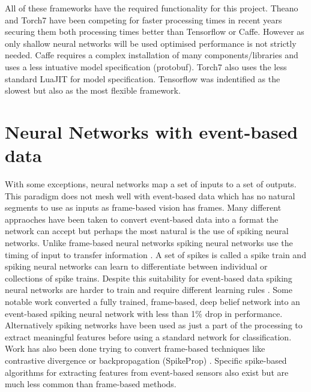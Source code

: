 All of these frameworks have the required functionality for this project.
Theano and Torch7 have been competing for faster processing times \cite{bergstra2010theano, collobert2011torch7, bastien2012theano} in recent years securing them both processing times better than Tensorflow or Caffe\cite{bahrampour2015comparative}.
However as only shallow neural networks will be used optimised performance is not strictly needed.
Caffe requires a complex installation of many components/libraries and uses a less intuative model specification (protobuf). 
Torch7 also uses the less standard LuaJIT for model specification.
Tensorflow was indentified as the slowest but also as the most flexible framework.

\section{Neural Networks with event-based data}
With some exceptions, neural networks map a set of inputs to a set of outputs.
This paradigm does not mesh well with event-based data which has no natural segments to use as inputs as frame-based vision has frames. 
Many different appraoches have been taken to convert event-based data into a format the network can accept but perhaps the most natural is the use of spiking neural networks. 
Unlike frame-based neural networks spiking neural networks use the timing of input to transfer information \cite{akolkar2015can}.
A set of spikes is called a spike train and spiking neural networks can learn to differentiate between individual or collections of spike trains. 
Despite this suitability for event-based data spiking neural networks are harder to train and require different learning rules \cite{walter2015neuromorphic, henderson2015spike}.
Some notable work converted a fully trained, frame-based, deep belief network into an event-based spiking neural network with less than 1\% drop in performance\cite{OConnor2013}. 
Alternatively spiking networks have been used as just a part of the processing to extract meaningful features before using a standard network for classification\cite{afshar2016investigation}.
Work has also been done trying to convert frame-based techniques like contrastive divergence \cite{Neftci2014} or backpropagation (SpikeProp) \cite{bohte2002error}.
Specific spike-based algorithms for extracting features from event-based sensors also exist \cite{Bichler} but are much less common than frame-based methods. 



